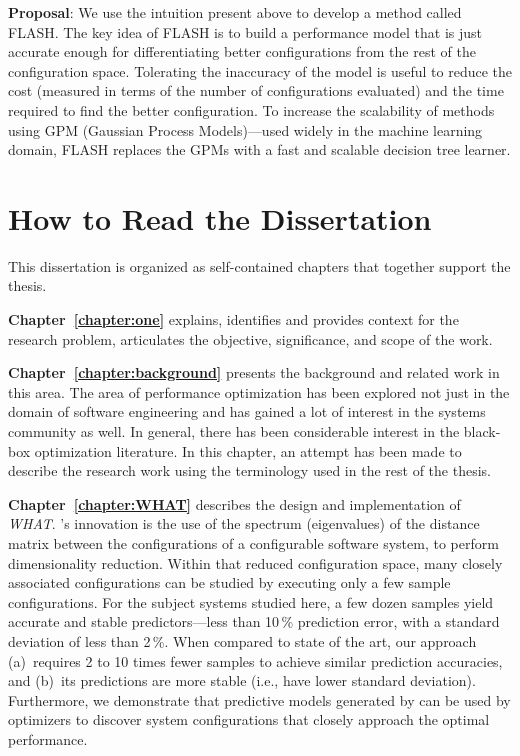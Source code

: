 \noindent\textbf{Proposal}:
We use the intuition present above to develop a method called FLASH.
The key idea of FLASH is to build a performance model that is just accurate enough for differentiating better configurations from the rest of the configuration space. Tolerating
the inaccuracy of the model is useful to reduce the cost
(measured in terms of the number of configurations evaluated)
and the time required to find the better configuration.
To increase the scalability of methods using GPM (Gaussian Process Models)---used widely in the machine learning domain, FLASH
replaces the GPMs with a fast and scalable decision tree learner.





\section{How to Read the Dissertation}
This dissertation is organized as self-contained chapters that together support
the thesis.

\textbf{Chapter~\ref{chapter:one}} explains, identifies and provides context for the research problem, articulates the objective, significance, and scope of the work.

\textbf{Chapter~\ref{chapter:background}} presents the background and related work in this area. The area of performance optimization has been explored not just in the domain of software engineering and has gained a lot of interest in the systems community as well. In general, there has been considerable interest in the black-box optimization literature. In this chapter, an attempt has been made to describe the research work using the terminology used in the rest of the thesis.

\textbf{Chapter~\ref{chapter:WHAT}} describes the design and implementation
of \emph{WHAT}.
{\what}'s innovation is the use of the spectrum (eigenvalues) of the distance matrix
between the configurations of a configurable software system, to perform dimensionality reduction. Within that
reduced configuration space, many closely associated configurations can be studied
by executing only a few sample configurations. For the subject systems studied
here, a few dozen samples yield accurate and stable predictors---less than 10\,\% prediction error, with a standard deviation of less than 2\,\%.  
When compared to state of the art, our approach (a)~requires 2 to 10 times fewer samples to achieve similar prediction accuracies,
and (b)~its predictions are more stable (i.e., have lower standard
deviation). 
Furthermore, we demonstrate that predictive models generated by
\what can be used by optimizers to discover system configurations that closely approach the optimal performance.


